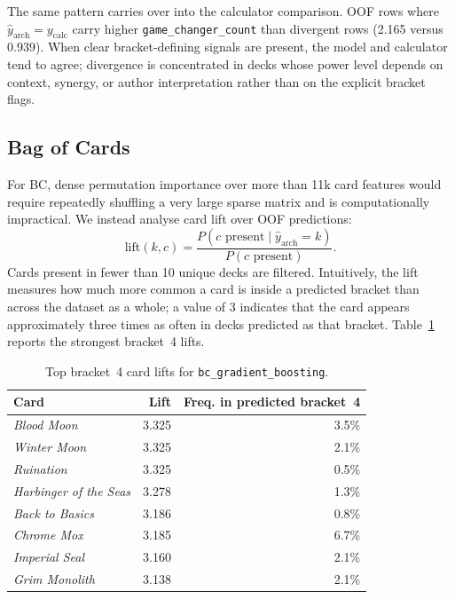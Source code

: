 \documentclass{article}
\begin{document}
The same pattern carries over into the calculator comparison. OOF rows where \(\hat{y}_{\text{arch}} = y_{\text{calc}}\) carry higher \texttt{game\_changer\_count} than divergent rows (2.165 versus 0.939). When clear bracket-defining signals are present, the model and calculator tend to agree; divergence is concentrated in decks whose power level depends on context, synergy, or author interpretation rather than on the explicit bracket flags.

\subsection{Bag of Cards}
\label{sec:interpretability:bc}

For BC, dense permutation importance over more than 11k card features would require repeatedly shuffling a very large sparse matrix and is computationally impractical. We instead analyse card lift over OOF predictions:
\[
\mathrm{lift}(k,c) = \frac{P(c \text{ present}\mid \hat{y}_{\text{arch}}=k)}{P(c \text{ present})}.
\]
Cards present in fewer than 10 unique decks are filtered. Intuitively, the lift measures how much more common a card is inside a predicted bracket than across the dataset as a whole; a value of 3 indicates that the card appears approximately three times as often in decks predicted as that bracket. Table~\ref{tab:bc-interpretability} reports the strongest bracket~4 lifts.

\begin{table}[h]
\centering
\caption{Top bracket~4 card lifts for \texttt{bc\_gradient\_boosting}.}
\label{tab:bc-interpretability}
\small
\begin{tabular}{lrr}
\toprule
Card & Lift & Freq. in predicted bracket~4 \\
\midrule
\textit{Blood Moon} & 3.325 & 3.5\% \\
\textit{Winter Moon} & 3.325 & 2.1\% \\
\textit{Ruination} & 3.325 & 0.5\% \\
\textit{Harbinger of the Seas} & 3.278 & 1.3\% \\
\textit{Back to Basics} & 3.186 & 0.8\% \\
\textit{Chrome Mox} & 3.185 & 6.7\% \\
\textit{Imperial Seal} & 3.160 & 2.1\% \\
\textit{Grim Monolith} & 3.138 & 2.1\% \\
\bottomrule
\end{tabular}
\end{table}
\end{document}
